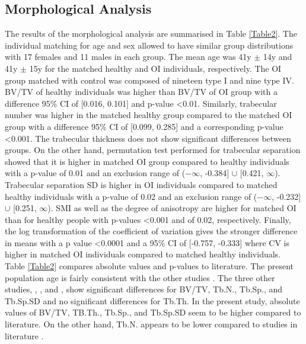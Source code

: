 \documentclass[a4paper,fleqn]{DC_ArtStyle}
\begin{document}
	\subsection{Morphological Analysis}
	The results of the morphological analysis are summarised in Table \ref{Table2}. The individual matching for age and sex allowed to have similar group distributions with 17 females and 11 males in each group. The mean age was 41y $\pm$ 14y and 41y $\pm$ 15y for the mat\-ched healthy and OI individuals, respectively. The OI group matched with control was composed of nineteen type I and nine type IV. BV/TV of healthy individuals was higher than BV/TV of OI group with a difference 95\% CI of [0.016, 0.101] and p-value <0.01. Similarly, trabecular number was higher in the matched healthy group compared to the matched OI group with a difference 95\% CI of [0.099, 0.285] and a corresponding p-value <0.001. The trabecular thickness does not show significant differences between groups. On the other hand, permutation test performed for trabecular separation showed that it is higher in matched OI group compared to healthy individuals with a p-value of 0.01 and an exclusion range of ($-\infty$, -0.384] $\cup$ [0.421, $\infty$). Trabecular separation SD is higher in OI individuals compared to matched healthy individuals with a p-value of 0.02 and an exclusion range of ($-\infty$, -0.232] $\cup$ [0.251, $\infty$). SMI as well as the degree of anisotropy are higher for matched OI than for healthy people with p-values <0.001 and of 0.02, respectively. Finally, the log transformation of the coefficient of variation gives the stronger difference in means with a p value <0.0001 and a 95\% CI of [-0.757, -0.333] where CV is higher in matched OI individuals compared to matched healthy individuals.\\
	
	Table \ref{Table2} compares absolute values and p-values to literature. The present population age is fairly consistent with the other studies \cite{Folkestad2012,Kocijan2015,Rolvien2018}. The three other studies,  \citeauthor{Folkestad2012}\cite{Folkestad2012}, \citeauthor{Kocijan2015}\cite{Kocijan2015}, and \citeauthor{Rolvien2018}\cite{Rolvien2018}, show significant differences for BV/TV, Tb.N., Tb.Sp., and Tb.Sp.SD and no significant differences for Tb.Th. In the present study, absolute values of BV/TV, TB.Th., Tb.Sp., and Tb.Sp.SD seem to be higher compared to literature. On the other hand, Tb.N. appears to be lower compared to studies in literature \cite{Folkestad2012,Kocijan2015,Rolvien2018}.
	
\end{document}
